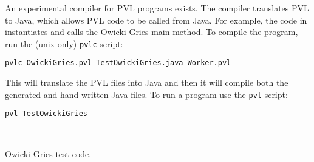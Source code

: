 An experimental compiler for PVL programs exists. The compiler
translates PVL to Java, which allows PVL code to be called from Java.
For example, the code in  instantiates and calls
the Owicki-Gries main method.
To compile the program, run the (unix only) \verb+pvlc+ script:
\begin{verbatim}
pvlc OwickiGries.pvl TestOwickiGries.java Worker.pvl
\end{verbatim}
This will translate the PVL files into Java and then it will compile
both the generated and hand-written Java files.
To run a program use the \verb+pvl+ script:
\begin{verbatim}
pvl TestOwickiGries
\end{verbatim}

\begin{listing}
 
\caption{Owicki-Gries test code.}
\label{og test}
\end{listing}


